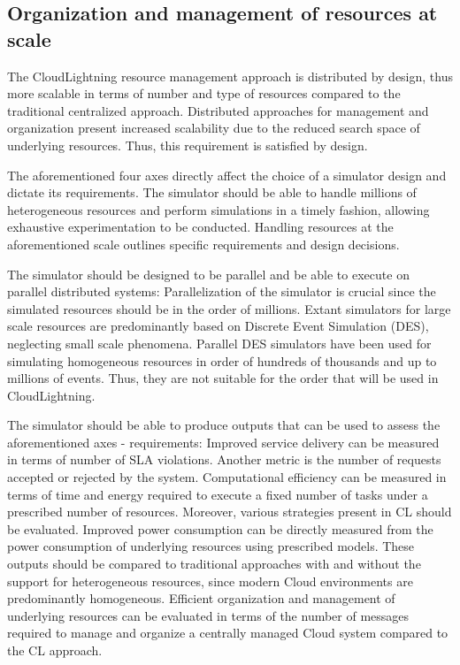 \subsection{Organization and management of resources at scale}

The CloudLightning resource management approach is distributed by design, thus more scalable in terms of number and type of resources compared to the traditional centralized approach. Distributed approaches for management and organization present increased scalability due to the reduced search space of underlying resources. Thus, this requirement is satisfied by design.


The aforementioned four axes directly affect the choice of a simulator design and dictate its requirements. The simulator should be able to handle millions of heterogeneous resources and perform simulations in a timely fashion, allowing exhaustive experimentation to be conducted. Handling resources at the aforementioned scale outlines specific requirements and design decisions.


The simulator should be designed to be parallel and be able to execute on parallel distributed systems: Parallelization of the simulator is crucial since the simulated resources should be in the order of millions. Extant simulators for large scale resources are predominantly based on Discrete Event Simulation (DES), neglecting small scale phenomena. Parallel DES simulators have been used for simulating homogeneous resources in order of hundreds of thousands and up to millions of events. Thus, they are not suitable for the order that will be used in CloudLightning.

The simulator should be able to produce outputs that can be used to assess the aforementioned axes - requirements: Improved service delivery can be measured in terms of number of SLA violations. Another metric is the number of requests accepted or rejected by the system. Computational efficiency can be measured in terms of time and energy required to execute a fixed number of tasks under a prescribed number of resources. Moreover, various strategies present in CL should be evaluated. Improved power consumption can be directly measured from the power consumption of underlying resources using prescribed models. These outputs should be compared to traditional approaches with and without the support for heterogeneous resources, since modern Cloud environments are predominantly homogeneous. Efficient organization and management of underlying resources can be evaluated in terms of the number of messages required to manage and organize a centrally managed Cloud system compared to the CL approach.

